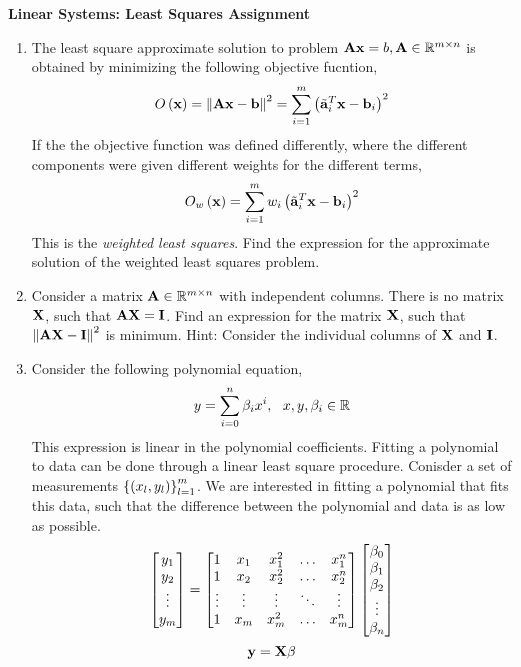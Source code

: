 \documentclass[9pt]{article}
\def\mf{\ensuremath\mathbf}
\def\mb{\ensuremath\mathbb}
\def\lp{\ensuremath\left(}
\def\rp{\ensuremath\right)}
\def\lV{\ensuremath\left\lVert}
\def\rV{\ensuremath\right\rVert}
\def\lc{\ensuremath\left\{}
\def\rc{\ensuremath\right\}}
\def\bmxc{\ensuremath\begin{bmatrix*}[c]}
\def\emxc{\ensuremath\end{bmatrix*}}
\begin{document}
\begin{center}
\begin{Large}
\textbf{Linear Systems: Least Squares Assignment}
\end{Large}
\end{center}
\vspace{0.2cm}

\begin{multicols}{2}

\begin{enumerate}
    \item The least square approximate solution to  problem $\mf{Ax} = b, \mf{A} \in \mb{R}^{m \times n}$ is obtained by minimizing the following objective fucntion,
    \[ O\lp\mf{x}\rp = \lV\mf{Ax} - \mf{b}\rV^2 = \sum_{i=1}^{m} \lp\tilde{\mf{a}}_i^T\mf{x} - \mf{b}_i\rp^2 \]
    If the the objective function was defined differently, where the different components were given different weights for the different terms, 
    \[ O_w\lp\mf{x}\rp = \sum_{i=1}^{m} w_i\lp\tilde{\mf{a}}_i^T\mf{x} - \mf{b}_i\rp^2 \]
    This is the \textit{weighted least squares}. Find the expression for the approximate solution of the weighted least squares problem.

    \item Consider a matrix $\mf{A} \in \mb{R}^{m \times n}$ with independent columns. There is no matrix $\mf{X}$, such that $\mf{A}\mf{X} = \mf{I}$. Find an expression for the matrix $\mf{X}$, such that $\lV\mf{A}\mf{X} - \mf{I}\rV^2$ is minimum. Hint: Consider the individual columns of $\mf{X}$ and $\mf{I}$.

    \item Consider the following polynomial equation,
    \[ y = \sum_{i=0}^{n} \beta_ix^i, \,\,\,\, x, y, \beta_i \in \mb{R} \]
    This expression is linear in the polynomial coefficients. Fitting a polynomial to data can be done through a linear least square procedure. Conisder a set of measurements $\lc\lp x_l, y_l \rp\rc_{l=1}^{m}$. We are interested in fitting a polynomial that fits this data, such that the difference between the polynomial and data is as low as possible.
    \[ \bmxc y_1\\ y_2\\ \vdots \\ y_m\emxc = \bmxc 1 & x_1 & x_1^2 & \ldots & x_1^n\\ 1 & x_2 & x_2^2 & \ldots & x_2^n\\ \vdots & \vdots & \vdots & \ddots & \vdots\\ 1 & x_m & x_m^2 & \ldots & x_m^n \emxc \bmxc\beta_0 \\ \beta_1 \\ \beta_2 \\ \vdots \\ \beta_n\emxc \]
    \[ \mf{y} = \mf{X}\mf{\beta} \]


\end{enumerate}
\end{multicols}
\end{document}

